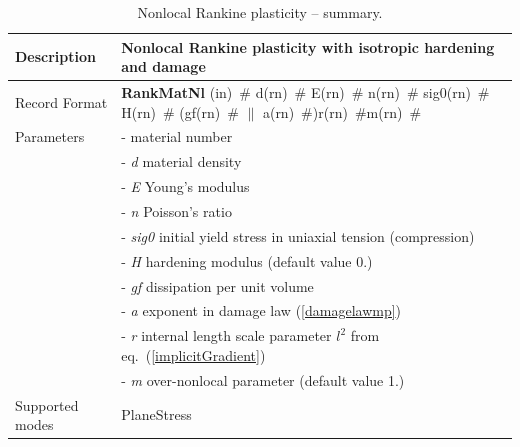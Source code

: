 \documentclass[a4paper]{article}
\newcommand{\descitem}[1]{{\noindent \bf #1}}
\newcommand{\elemparam}[2]{{{#1\tiny (#2)}~\#}}
\newcommand{\param}[1]{{\it #1}}
\begin{document}
\begin{table}[!htb]
\begin{tabular}{|l|p{9cm}|}
\hline
Description & Nonlocal Rankine plasticity with isotropic hardening and damage\\
\hline
Record Format & \descitem{RankMatNl}  \elemparam{}{in}
\elemparam{d}{rn} \elemparam{E}{rn} \elemparam{n}{rn} \elemparam{sig0}{rn} \elemparam{H}{rn} (\elemparam{gf}{rn} $\|$ \elemparam{a}{rn})\elemparam{r}{rn}\elemparam{m}{rn} \\
Parameters &- \param{} material number\\
&- \param{d} material density\\
&- \param{E} Young's modulus\\
&- \param{n} Poisson's ratio\\
&- \param{sig0} initial yield stress in uniaxial tension (compression)\\
&- \param{H} hardening modulus (default value 0.)\\
&- \param{gf} dissipation per unit volume\\
&- \param{a} exponent in damage law (\ref{damagelawmp})\\
&- \param{r} internal length scale parameter $l^2$ from eq.~(\ref{implicitGradient})\\
&- \param{m} over-nonlocal parameter (default value 1.)\\
Supported modes& PlaneStress\\
\hline
\end{tabular}
\caption{Nonlocal Rankine plasticity -- summary.}
\label{rankineMatNl_table}
\end{table}
\end{document}
